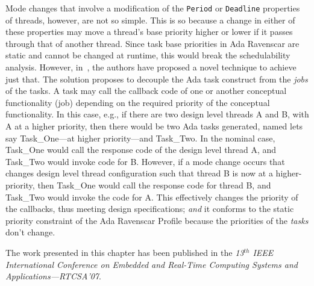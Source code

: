 Mode changes that involve a modification of the \texttt{Period} or
\texttt{Deadline} properties of threads, however, are not so
simple. This is so because a change in either of these properties may
move a thread's base priority higher or lower if it passes through
that of another thread. Since task base priorities in Ada Ravenscar
are static and cannot be changed at runtime, this would break the
schedulability analysis. However, in~\cite{puente@adalett01}, the
authors have proposed a novel technique to achieve just that. The
solution proposes to decouple the Ada task construct from the
\emph{jobs} of the tasks. A task may call the callback code of one or
another conceptual functionality (job) depending on the required
priority of the conceptual functionality. In this case, e.g., if there
are two design level threads A and B, with A at a higher priority,
then there would be two Ada tasks generated, named lets say
Task\_One---at higher priority---and Task\_Two. In the nominal case,
Task\_One would call the response code of the design level thread A,
and Task\_Two would invoke code for B. However, if a mode change
occurs that changes design level thread configuration such that thread
B is now at a higher-priority, then Task\_One would call the response
code for thread B, and Task\_Two would invoke the code for A. This
effectively changes the priority of the callbacks, thus meeting design
specifications; \emph{and} it conforms to the static priority
constraint of the Ada Ravenscar Profile because the priorities of the
\emph{tasks} don't change.

The work presented in this chapter has been published in the
\emph{13$^{th}$ IEEE International Conference on Embedded and
  Real-Time Computing Systems and Applications---RTCSA'07}.

